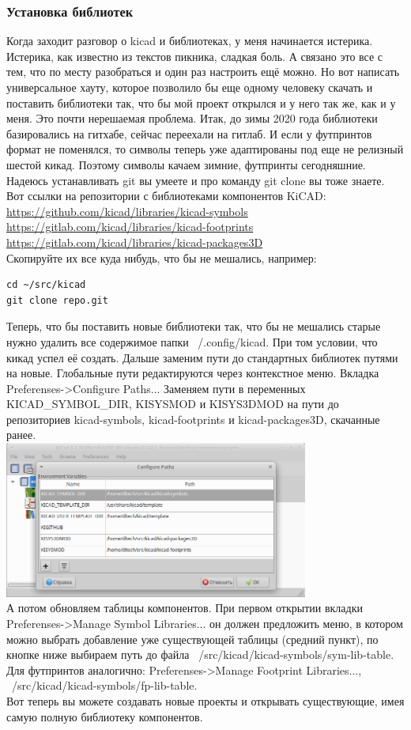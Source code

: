\documentclass[12pt,a4paper]{article}
\begin{document}
\subsubsection{Установка библиотек}
    Когда заходит разговор о kicad и библиотеках, у меня начинается истерика.
    Истерика, как известно из текстов пикника, сладкая боль. А связано это все
    с тем, что по месту разобраться и один раз настроить ещё можно. Но вот
    написать универсальное хауту, которое позволило бы еще одному
    человеку скачать и поставить библиотеки так, что бы мой проект открылся и
    у него так же, как и у меня. Это почти нерешаемая проблема.
    Итак, до зимы 2020 года библиотеки базировались на гитхабе, сейчас переехали
    на гитлаб. И если у футпринтов формат не поменялся, то символы теперь уже
    адаптированы под еще не релизный шестой кикад. Поэтому символы качаем
    зимние, футпринты сегодняшние. Надеюсь устанавливать git вы умеете и про
    команду git clone вы тоже знаете.
    Вот ссылки на репозитории с библиотеками компонентов KiCAD:\\
    \url{https://github.com/kicad/libraries/kicad-symbols}\\
    \url{https://gitlab.com/kicad/libraries/kicad-footprints}\\
    \url{https://gitlab.com/kicad/libraries/kicad-packages3D}\\
    Скопируйте их все куда нибудь, что бы не мешались, например:
\begin{lstlisting}
cd ~/src/kicad
git clone repo.git
\end{lstlisting}
    Теперь, что бы поставить новые библиотеки так, что бы не мешались старые
    нужно удалить все содержимое папки ~/.config/kicad. При том условии, что
    кикад успел её создать. Дальше заменим пути
    до стандартных библиотек путями на новые. Глобальные пути редактируются
    через контекстное меню. Вкладка Preferenses->Configure Paths...
    Заменяем пути в переменных KICAD\_SYMBOL\_DIR, KISYSMOD и KISYS3DMOD на пути
    до репозиториев kicad-symbols, kicad-footprints и kicad-packages3D, скачанные
    ранее.\\
    \includegraphics[width=10cm]{kipath.png}\\
    А потом обновляем таблицы компонентов. При первом открытии вкладки
    Preferenses->Manage Symbol Libraries... он должен предложить меню, в
    котором можно выбрать добавление уже существующей таблицы (средний пункт),
    по кнопке ниже
    выбираем путь до файла ~/src/kicad/kicad-symbols/sym-lib-table. Для
    футпринтов аналогично: Preferenses->Manage Footprint Libraries...,
    ~/src/kicad/kicad-symbols/fp-lib-table.\\
    Вот теперь вы можете создавать новые проекты и открывать существующие, имея
    самую полную библиотеку компонентов.
\end{document}
